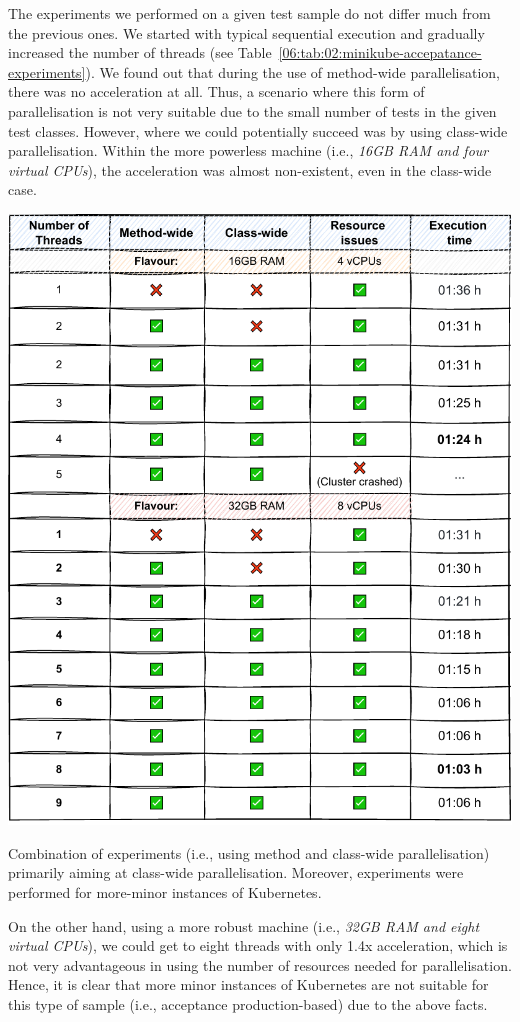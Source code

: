 The experiments we performed on a given test sample do not differ much from the previous ones.
We started with typical sequential execution and gradually increased the number of threads (see Table~\ref{06:tab:02:minikube-accepatance-experiments}).
We found out that during the use of method-wide parallelisation, there was no acceleration at all.
Thus, a scenario where this form of parallelisation is not very suitable due to the small number of tests in the given test classes.
However, where we could potentially succeed was by using class-wide parallelisation.
Within the more powerless machine (i.e., \emph{16GB RAM and four virtual CPUs}), the acceleration was almost non-existent, even in the class-wide case.
\begin{table}[ht!]
    \centering
    \includegraphics[scale=0.8]{obrazky-figures/08-experiments/acceptance/06-exp-minikube-accpeantace-second}
    \caption{Combination of experiments (i.e., using method and class-wide parallelisation) primarily aiming at class-wide
    parallelisation. Moreover, experiments were performed for more-minor instances of Kubernetes.}
    \label{06:tab:02:minikube-accepatance-experiments}
\end{table}
On the other hand, using a more robust machine (i.e., \emph {32GB RAM and eight virtual CPUs}),
we could get to eight threads with only 1.4x acceleration, which is not very advantageous in using the number of resources needed for parallelisation.
Hence, it is clear that more minor instances of Kubernetes are not suitable for this type of sample (i.e., acceptance production-based) due to the above facts.

